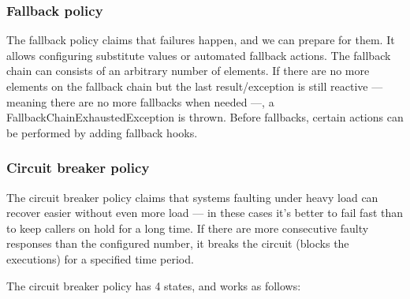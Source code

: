 \subsubsection{Fallback policy}

The fallback policy claims that failures happen, and we can prepare for them. It allows configuring substitute values or automated fallback actions. The fallback chain can consists of an arbitrary number of elements. If there are no more elements on the fallback chain but the last result/exception is still reactive — meaning there are no more fallbacks when needed —, a FallbackChainExhaustedException is thrown. Before fallbacks, certain actions can be performed by adding fallback hooks.

\subsubsection{Circuit breaker policy}

The circuit breaker policy claims that systems faulting under heavy load can recover easier without even more load — in these cases it's better to fail fast than to keep callers on hold for a long time. If there are more consecutive faulty responses than the configured number, it breaks the circuit (blocks the executions) for a specified time period.

The circuit breaker policy has 4 states, and works as follows:

